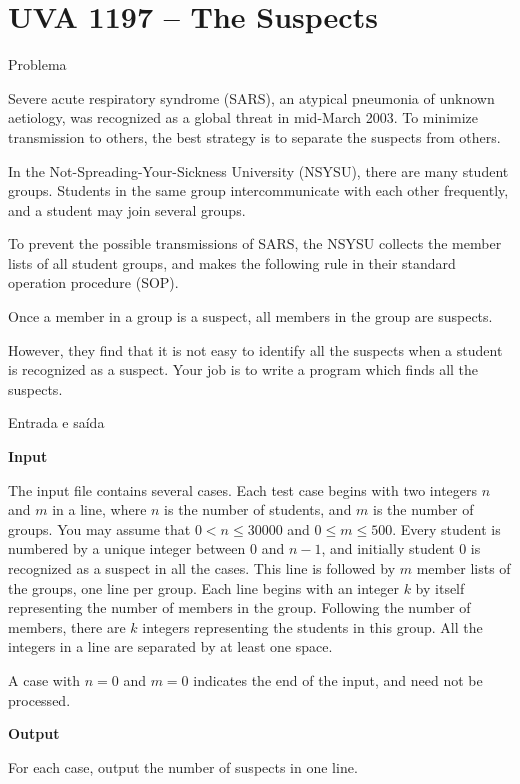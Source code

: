 \section{UVA 1197 -- The Suspects}

\begin{frame}[fragile]{Problema}

Severe acute respiratory syndrome (SARS), an atypical pneumonia of unknown aetiology, was recognized as a global threat in mid-March 2003. To minimize transmission to others, the best strategy is
to separate the suspects from others.

In the Not-Spreading-Your-Sickness University (NSYSU), there are many student groups. Students
in the same group intercommunicate with each other frequently, and a student may join several groups.

To prevent the possible transmissions of SARS, the NSYSU collects the member lists of all student
groups, and makes the following rule in their standard operation procedure (SOP).

\begin{center}
Once a member in a group is a suspect, all members in the group are suspects.
\end{center}

However, they find that it is not easy to identify all the suspects when a student is recognized as a
suspect. Your job is to write a program which finds all the suspects.

\end{frame}

\begin{frame}[fragile]{Entrada e saída}

\textbf{Input}

The input file contains several cases. Each test case begins with two integers $n$ and $m$ in a 
line, where $n$ is the number of students, and $m$ is the number of groups. You may assume that 
$0 < n \leq 30000$ and $0 \leq m \leq 500$. Every student is numbered by a unique integer between 
$0$ and $n - 1$, and initially student $0$ is recognized as a suspect in all the cases. This line 
is followed by $m$ member lists of the groups, one line per group. Each line begins with an 
integer $k$ by itself representing the number of members in the group. Following the number of 
members, there are $k$ integers representing the students in this group.  All the integers in a 
line are separated by at least one space.

A case with $n = 0$ and $m = 0$ indicates the end of the input, and need not be processed.

\textbf{Output}

For each case, output the number of suspects in one line.

\end{frame}


